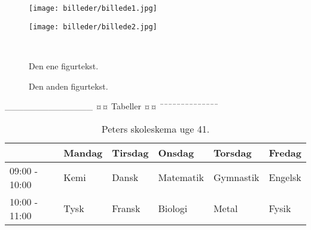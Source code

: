 \begin{figure}[H]
	\centering
	\begin{minipage}[b]{0.48\textwidth}
	\centering
	\texttt{[image: billeder/billede1.jpg]} %
	\end{minipage}
	\hfill
	\begin{minipage}[b]{0.48\textwidth}
	\centering
	\texttt{[image: billeder/billede2.jpg]} %
	\end{minipage}
	\\ %
	\begin{minipage}[t]{0.48\textwidth}
	\caption{Den ene figurtekst.} %
	\label{fig:billede1}
	\end{minipage}
	\hfill
	\begin{minipage}[t]{0.48\textwidth}
	\caption{Den anden figurtekst.} %
	\label{fig:billede2}
	\end{minipage}
\end{figure}




______________
¤¤ Tabeller ¤¤
¯¯¯¯¯¯¯¯¯¯¯¯¯¯

\begin{table}[htbp] %
	\centering 
	\begin{tabular}{|l|l|l|l|l|l|} %
		\hline 	%
					  & Mandag & Tirsdag & Onsdag    & Torsdag   & Fredag  \\ \hline 	%
		09:00 - 10:00 & Kemi   & Dansk   & Matematik & Gymnastik & Engelsk \\ \hline 
		10:00 - 11:00 & Tysk   & Fransk  & Biologi   & Metal     & Fysik   \\ \hline 
	\end{tabular} 
	\caption{Peters skoleskema uge 41.} 
	\label{tab:skoleskema} 
\end{table}

